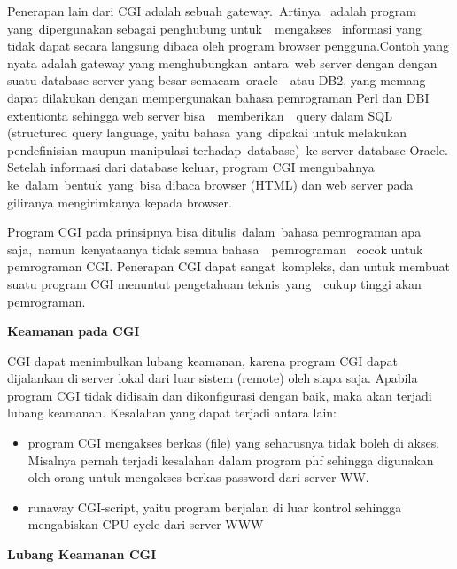 \vspace{12pt}
Penerapan lain dari CGI adalah sebuah gateway.~Artinya~ adalah  program yang~dipergunakan sebagai penghubung  untuk~~mengakses~ informasi  yang tidak dapat secara langsung dibaca oleh program browser pengguna.Contoh yang nyata adalah gateway yang menghubungkan~antara~web  server  dengan dengan suatu database server yang besar semacam~oracle~~atau  DB2, yang  memang dapat dilakukan dengan mempergunakan bahasa pemrograman Perl dan DBI extentionta sehingga web server bisa~~memberikan~~query  dalam  SQL (structured query language, yaitu bahasa~yang~dipakai  untuk  melakukan pendefinisian maupun manipulasi terhadap~database)~ke  server  database Oracle. Setelah informasi dari database keluar, program CGI mengubahnya ke~dalam~bentuk~yang~bisa dibaca browser (HTML)  dan  web  server  pada giliranya mengirimkanya kepada browser. \par
\vspace{12pt}
Program CGI pada prinsipnya bisa ditulis~dalam~bahasa  pemrograman  apa saja,~namun~kenyataanya tidak  semua  bahasa~~pemrograman~ cocok  untuk pemrograman CGI. Penerapan CGI dapat sangat~kompleks, dan untuk membuat  suatu program CGI menuntut pengetahuan teknis~yang~~cukup  tinggi  akan pemrograman. \par
\vspace{12pt}
\vspace{12pt}
\noindent 
\textbf{Keamanan pada CGI} \par
CGI dapat menimbulkan lubang keamanan, karena program CGI dapat dijalankan di server lokal dari luar sistem (remote) oleh siapa saja. Apabila program CGI tidak didisain dan dikonfigurasi dengan baik, maka akan terjadi lubang keamanan. Kesalahan yang dapat terjadi antara lain: \par
\noindent 
\begin{itemize}
	\item program CGI mengakses berkas (file) yang seharusnya tidak boleh di akses. Misalnya pernah terjadi kesalahan dalam program phf sehingga digunakan oleh orang untuk mengakses berkas password dari server WW. \par
	\noindent 
	\item runaway CGI-script, yaitu program berjalan di luar kontrol sehingga mengabiskan CPU cycle dari server WWW\end{itemize}
\par
\vspace{12pt}
\noindent 
\textbf{Lubang Keamanan CGI} \par
